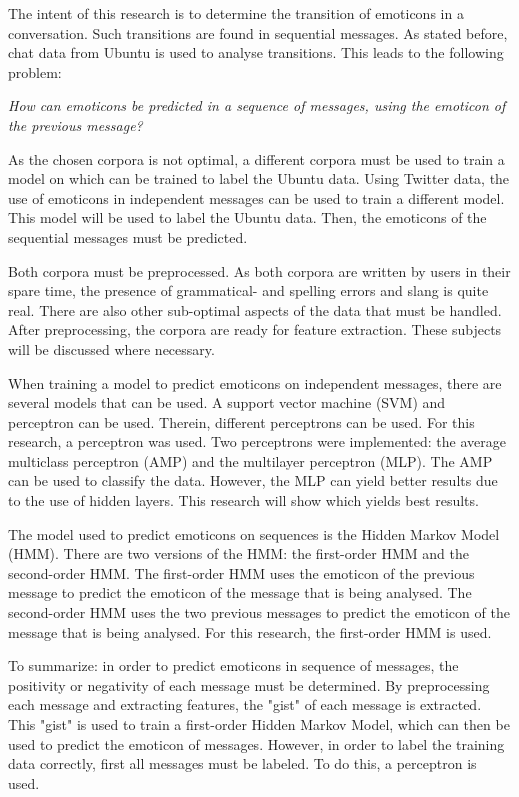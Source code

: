 
\begin{comment}
Problem: (roughly 1-2 pages)
• Explain the problem; what kind of assumptions / observations you have about the problem

\red{Find out what should be actually in this section} \\
\end{comment}

The intent of this research is to determine the transition of emoticons in a conversation. Such transitions are found in sequential messages. As stated before, chat data from Ubuntu is used to analyse transitions. This leads to the following problem: 
\begin{center}
\textit{How can emoticons be predicted in a sequence of messages, using the emoticon of the previous message?}
\end{center}

As the chosen corpora is not optimal, a different corpora must be used to train a model on which can be trained to label the Ubuntu data. Using Twitter data, the use of emoticons in independent messages can be used to train a different model. This model will be used to label the Ubuntu data. Then, the emoticons of the sequential messages must be predicted.

Both corpora must be preprocessed. As both corpora are written by users in their spare time, the presence of grammatical- and spelling errors and slang is quite real. There are also other sub-optimal aspects of the data that must be handled. After preprocessing, the corpora are ready for feature extraction. These subjects will be discussed where necessary.

When training a model to predict emoticons on independent messages, there are several models that can be used. A support vector machine (SVM) and perceptron can be used. Therein, different perceptrons can be used. For this research, a perceptron was used. Two perceptrons were implemented: the average multiclass perceptron (AMP) and the multilayer perceptron (MLP). The AMP can be used to classify the data. However, the MLP can yield better results due to the use of hidden layers. This research will show which yields best results.

The model used to predict emoticons on sequences is the Hidden Markov Model (HMM). There are two versions of the HMM: the first-order HMM and the second-order HMM. The first-order HMM uses the emoticon of the previous message to predict the emoticon of the message that is being analysed. The second-order HMM uses the two previous messages to predict the emoticon of the message that is being analysed. For this research, the first-order HMM is used.

To summarize: in order to predict emoticons in sequence of messages, the positivity or negativity of each message must be determined. By preprocessing each message and extracting features, the "gist" of each message is extracted. This "gist" is used to train a first-order Hidden Markov Model, which can then be used to predict the emoticon of messages. However, in order to label the training data correctly, first all messages must be labeled. To do this, a perceptron is used.